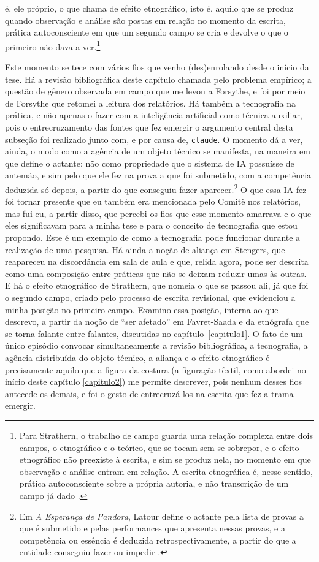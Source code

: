 é, ele próprio, o que \textcite{strathern2014efeito} chama de efeito etnográfico, isto é, aquilo que se produz quando observação e análise são postas em relação no momento da escrita, prática autoconsciente em que um segundo campo se cria e devolve o que o primeiro não dava a ver.\footnote{Para Strathern, o trabalho de campo guarda uma relação complexa entre dois campos, o etnográfico e o teórico, que se tocam sem se sobrepor, e o efeito etnográfico não preexiste à escrita, e sim se produz nela, no momento em que observação e análise entram em relação. A escrita etnográfica é, nesse sentido, prática autoconsciente sobre a própria autoria, e não transcrição de um campo já dado \parencite{strathern2014efeito}.}

Este momento se tece com vários fios que venho (des)enrolando desde o início da tese. Há a revisão bibliográfica deste capítulo chamada pelo problema empírico; a questão de gênero observada em campo que me levou a Forsythe, e foi por meio de Forsythe que retomei a leitura dos relatórios. Há também a tecnografia na prática, e não apenas o fazer-com a inteligência artificial como técnica auxiliar, pois o entrecruzamento das fontes que fez emergir o argumento central desta subseção foi realizado junto com, e por causa de, \texttt{claude}. O momento dá a ver, ainda, o modo como a agência de um objeto técnico se manifesta, na maneira em que \textcite{Latour2017Esperanca} define o actante: não como propriedade que o sistema de IA possuísse de antemão, e sim pelo que ele fez na prova a que foi submetido, com a competência deduzida só depois, a partir do que conseguiu fazer aparecer.\footnote{Em \textit{A Esperança de Pandora}, Latour define o actante pela lista de provas a que é submetido e pelas performances que apresenta nessas provas, e a competência ou essência é deduzida retrospectivamente, a partir do que a entidade conseguiu fazer ou impedir \parencite[Glossário]{Latour2017Esperanca}.} O que essa IA fez foi tornar presente que eu também era mencionada pelo Comitê nos relatórios, mas fui eu, a partir disso, que percebi os fios que esse momento amarrava e o que eles significavam para a minha tese e para o conceito de tecnografia que estou propondo. Este é um exemplo de como a tecnografia pode funcionar durante a realização de uma pesquisa. Há ainda a noção de aliança em Stengers, que reapareceu na discordância em sala de aula e que, relida agora, pode ser descrita como uma composição entre práticas que não se deixam reduzir umas às outras. E há o efeito etnográfico de Strathern, que nomeia o que se passou ali, já que foi o segundo campo, criado pelo processo de escrita revisional, que evidenciou a minha posição no primeiro campo. Examino essa posição, interna ao que descrevo, a partir da noção de \enquote{ser afetado} em Favret-Saada e da etnógrafa que se torna falante entre falantes, discutidas no capítulo~\ref{capitulo1}. O fato de um único episódio convocar simultaneamente a revisão bibliográfica, a tecnografia, a agência distribuída do objeto técnico, a aliança e o efeito etnográfico é precisamente aquilo que a figura da costura (a figuração têxtil, como abordei no início deste capítulo \ref{capitulo2}) me permite descrever, pois nenhum desses fios antecede os demais, e foi o gesto de entrecruzá-los na escrita que fez a trama emergir.

